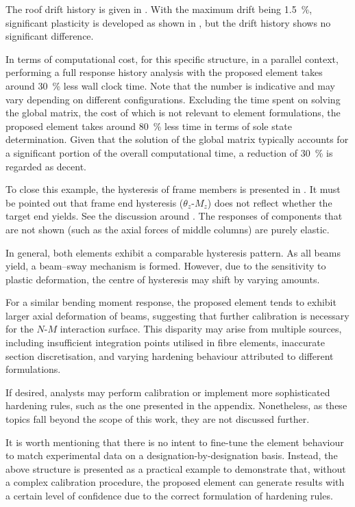 The roof drift history is given in .
With the maximum drift being \SI{1.5}{\percent}, significant plasticity is developed as shown in , but the drift history shows no significant difference.

In terms of computational cost, for this specific structure, in a parallel context, performing a full response history analysis with the proposed element takes around \SI{30}{\percent} less wall clock time. Note that the number is indicative and may vary depending on different configurations. Excluding the time spent on solving the global matrix, the cost of which is not relevant to element formulations, the proposed element takes around \SI{80}{\percent} less time in terms of sole state determination. Given that the solution of the global matrix typically accounts for a significant portion of the overall computational time, a reduction of \SI{30}{\percent} is regarded as decent.

To close this example, the hysteresis of frame members is presented in .
It must be pointed out that frame end hysteresis ($\theta_z$-$M_z$) does not reflect whether the target end yields. See the discussion around .
The responses of components that are not shown (such as the axial forces of middle columns) are purely elastic.

In general, both elements exhibit a comparable hysteresis pattern. As all beams yield, a beam--sway mechanism is formed. However, due to the sensitivity to plastic deformation, the centre of hysteresis may shift by varying amounts.

For a similar bending moment response, the proposed element tends to exhibit larger axial deformation of beams, suggesting that further calibration is necessary for the $N$-$M$ interaction surface. This disparity may arise from multiple sources, including insufficient integration points utilised in fibre elements, inaccurate section discretisation, and varying hardening behaviour attributed to different formulations.

If desired, analysts may perform calibration or implement more sophisticated hardening rules, such as the one presented in the appendix. Nonetheless, as these topics fall beyond the scope of this work, they are not discussed further.

It is worth mentioning that there is no intent to fine-tune the element behaviour to match experimental data on a designation-by-designation basis. Instead, the above structure is presented as a practical example to demonstrate that, without a complex calibration procedure, the proposed element can generate results with a certain level of confidence due to the correct formulation of hardening rules.

